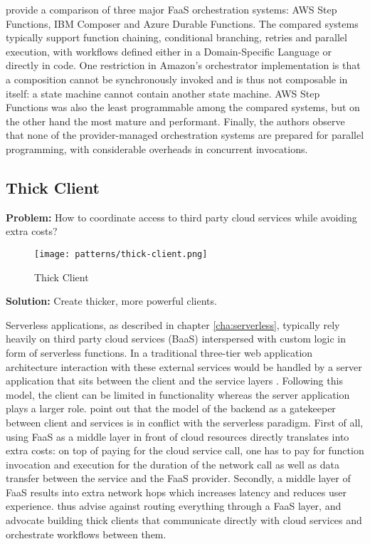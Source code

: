 \textcite{lopez18orchestration} provide a comparison of three major FaaS orchestration systems: AWS Step Functions, IBM Composer and Azure Durable Functions. The compared systems typically support function chaining, conditional branching, retries and parallel execution, with workflows defined either in a Domain-Specific Language or directly in code. One restriction in Amazon's orchestrator implementation is that a composition cannot be synchronously invoked and is thus not composable in itself: a state machine cannot contain another state machine. AWS Step Functions was also the least programmable among the compared systems, but on the other hand the most mature and performant. Finally, the authors observe that none of the provider-managed orchestration systems are prepared for parallel programming, with considerable overheads in concurrent invocations.

\subsection{Thick Client} \label{subsec:thickClient}

\textbf{Problem:} How to coordinate access to third party cloud services while avoiding extra costs?

\begin{figure}[h]
  \centering
  \texttt{[image: patterns/thick-client.png]}
  \caption{Thick Client}
  \label{fig:patternThickClient}
\end{figure}

\textbf{Solution:} Create thicker, more powerful clients.

Serverless applications, as described in chapter \ref{cha:serverless}, typically rely heavily on third party cloud services (BaaS) interspersed with custom logic in form of serverless functions. In a traditional three-tier web application architecture interaction with these external services would be handled by a server application that sits between the client and the service layers \parencite{robert2016serverlessarchitectures}. Following this model, the client can be limited in functionality whereas the server application plays a larger role. \textcite{sbarski2017serverless} point out that the model of the backend as a gatekeeper between client and services is in conflict with the serverless paradigm. First of all, using FaaS as a middle layer in front of cloud resources directly translates into extra costs: on top of paying for the cloud service call, one has to pay for function invocation and execution for the duration of the network call as well as data transfer between the service and the FaaS provider. Secondly, a middle layer of FaaS results into extra network hops which increases latency and reduces user experience. \textcite{sbarski2017serverless} thus advise against routing everything through a FaaS layer, and advocate building thick clients that communicate directly with cloud services and orchestrate workflows between them.

